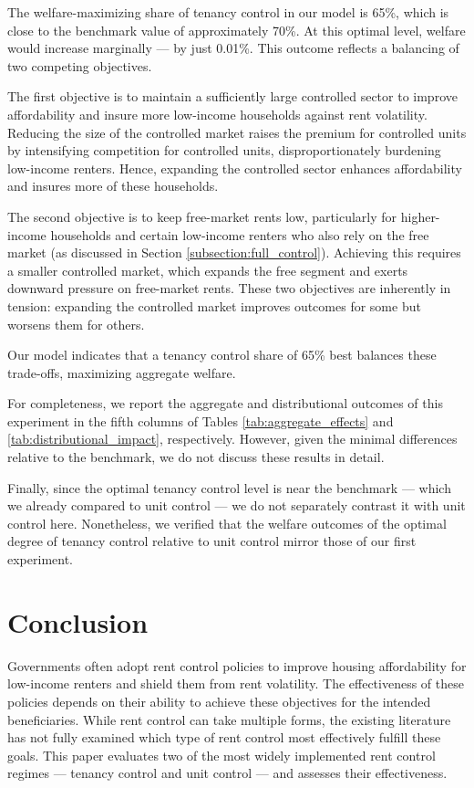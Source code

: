 \documentclass[parskip=full]{article}
\begin{document}
The welfare-maximizing share of tenancy control in our model is 65\%, which is close to the benchmark value of approximately 70\%. At this optimal level, welfare would increase marginally — by just 0.01\%. This outcome reflects a balancing of two competing objectives.

The first objective is to maintain a sufficiently large controlled sector to improve affordability and insure more low-income households against rent volatility. Reducing the size of the controlled market raises the premium for controlled units by intensifying competition for controlled units, disproportionately burdening low-income renters. Hence, expanding the controlled sector enhances affordability and insures more of these households.

The second objective is to keep free-market rents low, particularly for higher-income households and certain low-income renters who also rely on the free market (as discussed in Section \ref{subsection:full_control}). Achieving this requires a smaller controlled market, which expands the free segment and exerts downward pressure on free-market rents. These two objectives are inherently in tension: expanding the controlled market improves outcomes for some but worsens them for others.

Our model indicates that a tenancy control share of 65\% best balances these trade-offs, maximizing aggregate welfare.

For completeness, we report the aggregate and distributional outcomes of this experiment in the fifth columns of Tables \ref{tab:aggregate_effects} and \ref{tab:distributional_impact}, respectively. However, given the minimal differences relative to the benchmark, we do not discuss these results in detail.

Finally, since the optimal tenancy control level is near the benchmark — which we already compared to unit control — we do not separately contrast it with unit control here. Nonetheless, we verified that the welfare outcomes of the optimal degree of tenancy control relative to unit control mirror those of our first experiment.

\section{Conclusion}\label{sec:conclusion}

Governments often adopt rent control policies to improve housing affordability for low-income renters and shield them from rent volatility. The effectiveness of these policies depends on their ability to achieve these objectives for the intended beneficiaries. While rent control can take multiple forms, the existing literature has not fully examined which type of rent control most effectively fulfill these goals. This paper evaluates two of the most widely implemented rent control regimes — tenancy control and unit control — and assesses their effectiveness.
\end{document}
